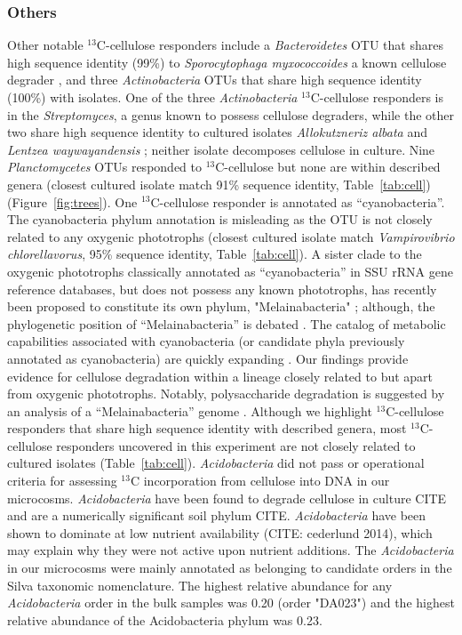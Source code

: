 \documentclass{article}
\begin{document}
\subsubsection{Others}\label{cell:others}
Other notable $^{13}$C-cellulose responders include a \textit{Bacteroidetes}
OTU that shares high sequence identity (99\%) to \textit{Sporocytophaga
myxococcoides} a known cellulose degrader \citep{Vance_1980}, and three
\textit{Actinobacteria} OTUs that share high sequence identity (100\%) with
isolates. One of the three \textit{Actinobacteria}
$^{13}$C-cellulose responders is in the \textit{Streptomyces}, a genus known to
possess cellulose degraders, while the other two share high sequence identity
to cultured isolates \textit{Allokutzneriz albata} \citep{Labeda_2008,
Tomita_1993} and \textit{Lentzea waywayandensis} \citep{LABEDA_1989,
Labeda_2001}; neither isolate decomposes cellulose in culture. Nine
\textit{Planctomycetes} OTUs responded to $^{13}$C-cellulose but none are within
described genera (closest cultured isolate match 91\% sequence identity,
Table~\ref{tab:cell}) (Figure~\ref{fig:trees}). One
$^{13}$C-cellulose responder is annotated as ``cyanobacteria''.
The cyanobacteria phylum annotation is misleading as the OTU is not closely
related to any oxygenic phototrophs (closest cultured isolate match
\textit{Vampirovibrio chlorellavorus}, 95\% sequence identity,
Table~\ref{tab:cell}). A sister clade to the oxygenic phototrophs classically
annotated as ``cyanobacteria'' in SSU rRNA gene reference databases, but does
not possess any known phototrophs, has recently been proposed to constitute its own
phylum, "Melainabacteria" \citet{Di_Rienzi_2013}; although, the phylogenetic
position of ``Melainabacteria'' is debated \citep{Soo_2014}. The catalog of
metabolic capabilities associated with cyanobacteria (or candidate phyla
previously annotated as cyanobacteria) are quickly expanding
\citep{Di_Rienzi_2013, Soo_2014}. Our findings provide evidence for cellulose
degradation within a lineage closely related to but apart from oxygenic
phototrophs. Notably, polysaccharide degradation is suggested by an analysis of
a ``Melainabacteria'' genome \citep{Di_Rienzi_2013}. Although we highlight
$^{13}$C-cellulose responders that share high sequence identity with described
genera, most $^{13}$C-cellulose responders uncovered in this experiment are not
closely related to cultured isolates (Table~\ref{tab:cell}).
\textit{Acidobacteria} did not pass or operational criteria for assessing
$^{13}$C incorporation from cellulose into DNA in our microcosms. 
\textit{Acidobacteria} have been found to degrade cellulose in culture CITE and
are a numerically significant soil phylum CITE. \textit{Acidobacteria} have
been shown to dominate at low nutrient availability (CITE: cederlund 2014),
which may explain why they were not active upon nutrient additions. 
The \textit{Acidobacteria} in our microcosms were mainly annotated as belonging
to candidate orders in the Silva taxonomic nomenclature. The highest relative
abundance for any \textit{Acidobacteria} order in the bulk samples was 0.20
(order "DA023") and the highest relative abundance of the Acidobacteria phylum
was 0.23.
\end{document}
